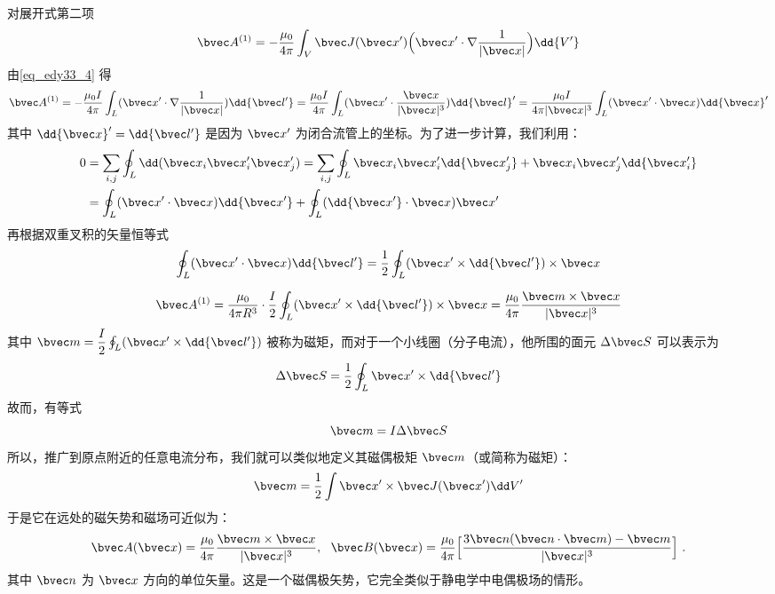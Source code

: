 对展开式第二项
\begin{equation}
\bvec A^{(1)}=-\dfrac{\mu_0 }{4\pi}\int_V \bvec J(\bvec x^{\prime})\Big (\bvec x^{\prime}\cdot\nabla\dfrac{1}{|\bvec x|}\Big)\dd{V^{\prime}}\label{eq_edy33_6}
\end{equation}
由\autoref{eq_edy33_4} 得
\begin{equation}
\bvec A^{(1)}=-\dfrac{\mu_0 I }{4\pi}\int_L (\bvec x^{\prime}\cdot\nabla\dfrac{1}{|\bvec x|}) \dd{\bvec l'}=\dfrac{\mu_0 I }{4\pi}\int_L (\bvec x^{\prime}\cdot\dfrac{\bvec x}{|\bvec x|^3})\dd {\bvec l}^{\prime}
=\dfrac{\mu_0 I }{4\pi|\bvec x|^3}\int_L (\bvec x^{\prime}\cdot \bvec x)\dd {\bvec x}^{\prime}
\label{eq_edy33_7}
\end{equation}
其中 $\dd{\bvec x}^{\prime}=\dd{\bvec l'}$ 是因为 $ \bvec x^{\prime}$ 为闭合流管上的坐标。为了进一步计算，我们利用：
\begin{equation}
\begin{aligned}
0&=\sum_{i,j}\oint_L \dd(\bvec x_i \bvec x'_i \bvec x'_j)=\sum_{i,j}\oint_L \bvec x_i \bvec x'_i \dd {\bvec x'_j} + \bvec x_i \bvec x'_j \dd {\bvec x'_i}\\
&=
\oint_L (\bvec x^{\prime}\cdot\bvec x)\dd {\bvec x'}+\oint_L (\dd {\bvec x'}\cdot \bvec x)\bvec x^{\prime}
\end{aligned}
\end{equation}
再根据双重叉积的矢量恒等式
\begin{equation}
\oint_L (\bvec x^{\prime}\cdot \bvec x)\dd{\bvec l'}=\dfrac1 2\oint_L (\bvec x^{\prime}\times \dd{\bvec l'})\times \bvec x \label{eq_edy33_9}
\end{equation}

\begin{equation}
\bvec A^{(1)}=\dfrac{\mu_0}{4\pi R^3}\cdot\dfrac{I}{2}\oint_L (\bvec x^{\prime}\times \dd{\bvec l'})\times \bvec x=\dfrac{\mu_0}{4\pi}\dfrac{\bvec m \times \bvec x}{|\bvec x|^3}\label{eq_edy33_10}
\end{equation}
其中 $\bvec m =\dfrac{I}{2}\oint_L (\bvec x^{\prime}\times \dd{\bvec l'})$ 被称为磁矩，而对于一个小线圈（分子电流），他所围的面元 $\Delta\bvec S$ 可以表示为
\begin{equation}
\Delta\bvec S=\dfrac 1 2\oint_L \bvec x^{\prime}\times \dd{\bvec l'}
\end{equation}
故而，有等式
\begin{equation}
\bvec m=I\Delta \bvec S
\end{equation}
所以，推广到原点附近的任意电流分布，我们就可以类似地定义其磁偶极矩 $\bvec m$（或简称为磁矩）：
\begin{equation}
\bvec m=\frac{1}{2}\int \bvec x' \times \bvec J(\bvec x') \dd V'
\end{equation}
于是它在远处的磁矢势和磁场可近似为：
\begin{equation}
\bvec A(\bvec x)=\frac{\mu_0}{4\pi}\frac{\bvec m\times \bvec x}{|\bvec x|^3},\ \ 
\bvec B(\bvec x)=\frac{\mu_0}{4\pi}\Big [\frac{3\bvec n(\bvec n\cdot \bvec m)-\bvec m}{|\bvec x|^3}\Big]~.
\end{equation}
其中 $\bvec n$ 为 $\bvec x$ 方向的单位矢量。这是一个磁偶极矢势，它完全类似于静电学中电偶极场的情形。